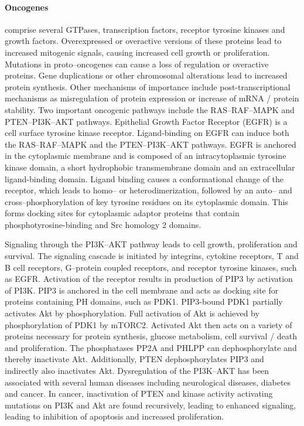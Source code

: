 {{{      \paragraph{Oncogenes} comprise several GTPases, transcription factors,
      receptor tyrosine kinases and growth factors. Overexpressed or overactive
      versions of these proteins lead to increased mitogenic signals, causing
      increased cell growth or proliferation. Mutations in proto--oncogenes can
      cause a loss of regulation or overactive proteins. Gene duplications or
      other chromosomal alterations lead to increased protein synthesis. Other
      mechanisms of importance include post-transcriptional mechanisms as
      misregulation of protein expression or increase of mRNA / protein
      stability. Two important oncogenic pathways include the RAS--RAF--MAPK and
      PTEN--PI3K--AKT pathways. Epithelial Growth Factor Receptor (EGFR) is a
      cell surface tyrosine kinase receptor. Ligand-binding on EGFR can induce
      both the RAS--RAF--MAPK and the PTEN--PI3K--AKT  pathways. EGFR is
      anchored in the cytoplasmic membrane and is composed of an
      intracytoplasmic tyrosine kinase domain, a short hydrophobic transmembrane
      domain and an extracellular ligand-binding domain. Ligand binding causes a
      conformational change of the receptor, which leads to homo-- or
      heterodimerization, followed by an auto-- and cross--phosphorylation of
      key tyrosine residues on its cytoplasmic domain. This forms docking sites
      for cytoplasmic adaptor proteins that contain phosphotyrosine-binding and
      Src homology 2 domains.

      Signaling through the PI3K--AKT pathway leads to cell growth,
      proliferation and survival. The signaling cascade is initiated by
      integrins, cytokine receptors, T and B cell receptors, G--protein coupled
      receptors, and receptor tyrosine kinases, such as EGFR. Activation of the
      receptor results in production of PIP3 by activation of PI3K. PIP3 is
      anchored in the cell membrane and acts as docking site for proteins
      containing PH domains, such as PDK1. PIP3-bound PDK1 partially activates
      Akt by phosphorylation. Full activation of Akt is achieved by
      phosphorylation of PDK1 by mTORC2. Activated Akt then acts on a variety of
      proteins necessary for protein synthesis, glucose metabolism, cell
      survival / death and proliferation. The phosphatases PP2A and PHLPP can
      dephosphorylate and thereby inactivate Akt. Additionally, PTEN
      dephosphorylates PIP3 and indirectly also inactivates Akt. Dysregulation
      of the PI3K--AKT has been associated with several human diseases including
      neurological diseases, diabetes and cancer. In cancer, inactivation of
      PTEN and kinase activity activating mutations on PI3K and Akt are found
      recursively, leading to enhanced signaling, leading to inhibition of
      apoptosis and increased proliferation.

}}}
